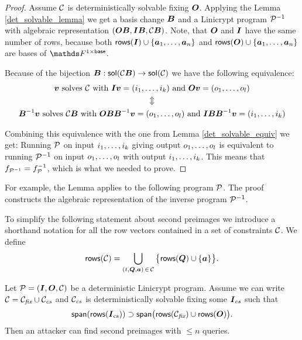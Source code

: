 \begin{proof}
Assume $\C$ is deterministically solvable fixing $\O$.
Applying the Lemma \ref{det_solvable_lemma} we get a basis change $\B$
and a Linicrypt program $\P^{-1}$ with algebraic representation $(\O \B, \I \B, \C \B)$.
Note, that $\O$ and $\I$ have the same number of rows, because both $\rows(\I) \cup \{\dts \va n\}$ and
$\rows(\O) \cup \{\dts \va n\}$ are bases of $\F^{1\times\base}$.

Because of the bijection $\B: \sol(\C\B) \to \sol(\C)$ we have the following equivalence:
\begin{gather*}
    \vv \textrm{ solves } \C \textrm{ with }
    \I \vv = \vec i k \textrm{ and } \O \vv = \vec o l \\
    \Updownarrow \\
    \B^{-1} \vv \textrm{ solves } \C \B \textrm{ with }
    \O \B \B^{-1} \vv = \vec o l  \textrm{ and }\I \B \B^{-1} \vv = \vec i k  
\end{gather*}

Combining this equivalence with the one from Lemma \ref{det_solvable_equiv} we get:
Running $\P$ on input $\dts i k$ giving output $\dts o l$ is equivalent to running 
$\P^{-1}$ on input $\dts o l$ with output $\dts i k$.
This means that $f_{\P^{-1}} = f_\P^{-1}$, which is what we needed to prove.
\end{proof}

For example, the Lemma applies to the following program $\P$. 
The proof constructs the algebraic representation of the inverse program $\P^{-1}$.
\begin{pchstack}[center,space=2cm]
\end{pchstack}

To simplify the following statement about second preimages we introduce a shorthand notation
for all the row vectors contained in a set of constraints $\C$.
We define \[
\rows(\C) = \bigcup_{(t, \Q,\va) \, \in \, \C} \big\{ \rows(\Q) \cup \{ \va \} \big\}.
\]

\begin{lemma}
    Let $\P = (\I, \O, \C)$ be a deterministic Linicrypt program.
    Assume we can write $\C = \Cfix \cup \Ccs$ and
    $\Ccs$ is deterministically solvable fixing some $\I_{cs}$ such that
    \begin{equation}
    \label{cs_condition}
        \spn(\rows(\I_\textrm{cs})) \supset \spn\big(\rows(\Cfix) \cup \rows(\O)\big).
    \end{equation}
    Then an attacker can find second preimages with $\leq n$ queries.
\end{lemma}

